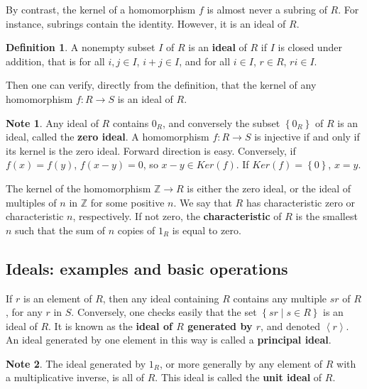 \documentclass{article}
\newcommand{\Z}{\mathbb{Z}}
\newcommand{\rb}[1]{\left( #1 \right)}
\newcommand{\cb}[1]{\left\{ #1 \right\}}
\newcommand{\ab}[1]{\left\langle #1 \right\rangle}
\theoremstyle{definition}\newtheorem{definition}{Definition}[subsection]
\theoremstyle{definition}\newtheorem{remark}[definition]{Remark}
\theoremstyle{definition}\newtheorem*{example}{Example}
\theoremstyle{definition}\newtheorem*{note}{Note}
\begin{document}
By contrast, the kernel of a homomorphism $ f $ is almost never a subring of $ R $. For instance, subrings contain the identity. However, it is an ideal of $ R $.


\begin{definition}
A nonempty subset $ I $ of $ R $ is an \textbf{ideal} of $ R $ if $ I $ is closed under addition, that is for all $ i, j \in I $, $ i + j \in I $, and for all $ i \in I $, $ r \in R $, $ ri \in I $.
\end{definition}

Then one can verify, directly from the definition, that the kernel of any homomorphism $ f : R \to S $ is an ideal of $ R $.

\begin{note}
Any ideal of $ R $ contains $ 0_R $, and conversely the subset $ \cb{0_R} $ of $ R $ is an ideal, called the \textbf{zero ideal}. A homomorphism $ f : R \to S $ is injective if and only if its kernel is the zero ideal. Forward direction is easy. Conversely, if $ f\rb{x} = f\rb{y} $, $ f\rb{x - y} = 0 $, so $ x - y \in Ker\rb{f} $. If $ Ker\rb{f} = \cb{0} $, $ x = y $.
\end{note}

The kernel of the homomorphism $ \Z \to R $ is either the zero ideal, or the ideal of multiples of $ n $ in $ \Z $ for some positive $ n $. We say that $ R $ has characteristic zero or characteristic $ n $, respectively. If not zero, the \textbf{characteristic} of $ R $ is the smallest $ n $ such that the sum of $ n $ copies of $ 1_R $ is equal to zero.

\subsection{Ideals: examples and basic operations}

If $ r $ is an element of $ R $, then any ideal containing $ R $ contains any multiple $ sr $ of $ R $, for any $ r $ in $ S $. Conversely, one checks easily that the set $ \cb{sr \mid s \in R} $ is an ideal of $ R $. It is known as the \textbf{ideal of $ R $ generated by $ r $}, and denoted $ \ab{r} $. An ideal generated by one element in this way is called a \textbf{principal ideal}.

\begin{note}
The ideal generated by $ 1_R $, or more generally by any element of $ R $ with a multiplicative inverse, is all of $ R $. This ideal is called the \textbf{unit ideal} of $ R $.
\end{note}
\end{document}
